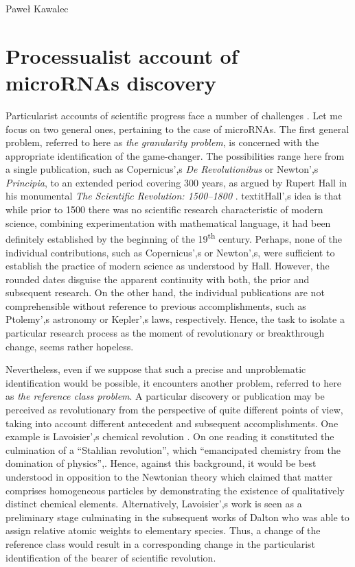 \begin{artengenv}{Paweł Kawalec}
\section{Processualist account of microRNAs discovery }
Particularist accounts of scientific progress face a number of challenges
\parencite[][]{losee_theories_2004}. %
 Let me focus on two general ones, pertaining to the case of microRNAs. The first general problem, referred to here as \textit{the} \textit{granularity problem}, is concerned with the appropriate identification of the game-changer. The possibilities range here from a single publication, such as Copernicus',s \textit{De Revolutionibus} or Newton',s \textit{Principia}, to an extended period covering 300 years, as argued by Rupert Hall in his monumental \textit{The Scientific Revolution: 1500–1800} 
\parencite[][]{hall_scientific_1954}. %
 textitHall',s idea is that while prior to 1500 there was no scientific research characteristic of modern science, combining experimentation with mathematical language, it had been definitely established by the beginning of the 19\textsuperscript{th} century. Perhaps, none of the individual contributions, such as Copernicus',s or Newton',s, were sufficient to establish the practice of modern science as understood by Hall. However, the rounded dates disguise the apparent continuity with both, the prior and subsequent research. On the other hand, the individual publications are not comprehensible without reference to previous accomplishments, such as Ptolemy',s astronomy or Kepler',s laws, respectively. Hence, the task to isolate a particular research process as the moment of revolutionary or breakthrough change, seems rather hopeless.

Nevertheless, even if we suppose that such a precise and unproblematic identification would be possible, it encounters another problem, referred to here as \textit{the reference class problem}. A particular discovery or publication may be perceived as revolutionary from the perspective of quite different points of view, taking into account different antecedent and subsequent accomplishments. One example is Lavoisier',s chemical revolution
\parencite[][p.66]{losee_theories_2004}. %
 On one reading it constituted the culmination of a ``Stahlian revolution'', which ``emancipated chemistry from the domination of physics'',. Hence, against this background, it would be best understood in opposition to the Newtonian theory which claimed that matter comprises homogeneous particles by demonstrating the existence of qualitatively distinct chemical elements. Alternatively, Lavoisier',s work is seen as a preliminary stage culminating in the subsequent works of Dalton who was able to assign relative atomic weights to elementary species. Thus, a change of the reference class would result in a corresponding change in the particularist identification of the bearer of scientific revolution.


\end{artengenv}
